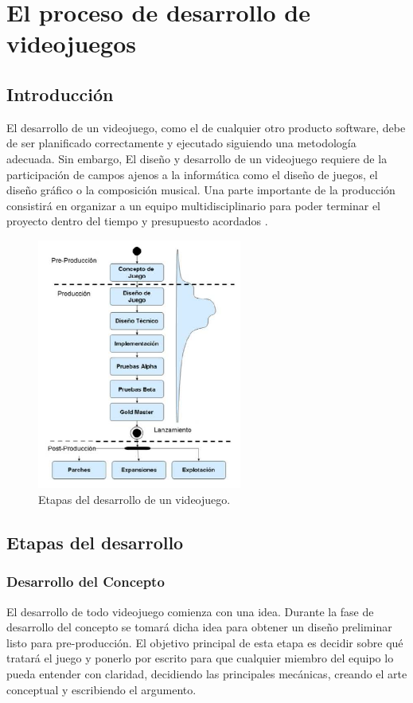 \section{El proceso de desarrollo de videojuegos}
\subsection{Introducción}
El desarrollo de un videojuego, como el de cualquier otro producto software, debe de ser planificado correctamente y ejecutado siguiendo una metodología adecuada. Sin embargo, El diseño y desarrollo de un videojuego requiere de la participación de campos ajenos a la informática como el diseño de juegos, el diseño gráfico o la composición musical. Una parte importante de la producción consistirá en organizar a un equipo multidisciplinario para poder terminar el proyecto dentro del tiempo y presupuesto acordados \cite{libro_esi}.

\begin{figure}[h]
    \centering
    \includegraphics[width=0.6\textwidth]{images/estadodelarte/desarrollo/etapas-desarrollo}
    \caption{Etapas del desarrollo de un videojuego.}
\end{figure}

\subsection{Etapas del desarrollo}
\subsubsection{Desarrollo del Concepto}
El desarrollo de todo videojuego comienza con una idea. Durante la fase de desarrollo del concepto se tomará dicha idea para obtener un diseño preliminar listo para pre-producción. El objetivo principal de esta etapa es decidir sobre qué tratará el juego y ponerlo por escrito para que cualquier miembro del equipo lo pueda entender con claridad, decidiendo las principales mecánicas, creando el arte conceptual y escribiendo el argumento\cite{game_design_2}. 

